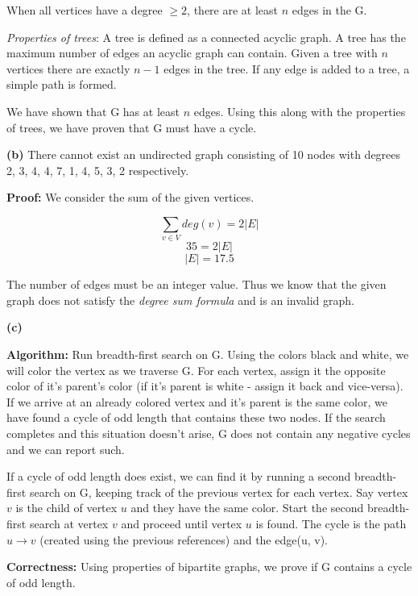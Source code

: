 \documentclass[11pt]{article}
\renewcommand\part[1]{\vspace{.10in}\textbf{(#1)}}
\newcommand\algorith{\vspace{.10in}\textbf{Algorithm: }}
\newcommand\correctness{\vspace{.10in}\textbf{Correctness: }}
\begin{document}
When all vertices have a degree $\geq 2$, there are at least $n$ edges in the G. 

\textit{Properties of trees}: A tree is defined as a connected acyclic graph. A tree has the maximum number of edges an acyclic graph can contain. Given a tree with $n$ vertices there are exactly $n - 1$ edges in the tree. If any edge is added to a tree, a simple path is formed.

We have shown that G has at least $n$ edges. Using this along with the properties of trees, we have proven that G must have a cycle.

\part{b} There cannot exist an undirected graph consisting of 10 nodes with degrees 2, 3, 4, 4, 7, 1, 4, 5, 3, 2 respectively.

\textbf{Proof:} We consider the sum of the given vertices.

$$\sum_{v \in V} deg(v) = 2|E|$$
$$35 = 2|E|$$
$$|E| = 17.5$$

The number of edges must be an integer value. Thus we know that the given graph does not satisfy the \textit{degree sum formula} and is an invalid graph.

\part{c}

\algorith Run breadth-first search on G. Using the colors black and white, we will color the vertex as we traverse G. For each vertex, assign it the opposite color of it's parent's color (if it's parent is white - assign it back and vice-versa). If we arrive at an already colored vertex and it's parent is the same color, we have found a cycle of odd length that contains these two nodes. If the search completes and this situation doesn't arise, G does not contain any negative cycles and we can report such.

	If a cycle of odd length does exist, we can find it by running a second breadth-first search on G, keeping track of the previous vertex for each vertex. Say vertex $v$ is the child of vertex $u$ and they have the same color. Start the second breadth-first search at vertex $v$ and proceed until vertex $u$ is found. The cycle is the path $u \rightarrow v$ (created using the previous references) and the edge(u, v).
	
\correctness Using properties of bipartite graphs, we prove if G contains a cycle of odd length.
\end{document}
